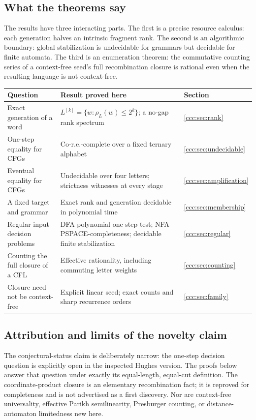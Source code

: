\documentclass[11pt,letterpaper]{article}
\theoremstyle{definition}
\theoremstyle{remark}
\newcommand{\gen}[2]{#1^{[#2]}}
\newcommand{\rank}{\rho}
\begin{document}
\subsection{What the theorems say}

The results have three interacting parts. The first is a precise resource
calculus: each generation halves an intrinsic fragment rank. The second is
an algorithmic boundary: global stabilization is undecidable for grammars but
decidable for finite automata. The third is an enumeration theorem: the
commutative counting series of a context-free seed's full recombination
closure is rational even when the resulting language is not context-free.

\begin{center}\small
\begin{tabular}{@{}p{}p{}p{}@{}}
\toprule
\textbf{Question} & \textbf{Result proved here} & \textbf{Section}\\
\midrule
Exact generation of a word &
$\gen Lk=\{w:\rank_L(w)\leq2^k\}$; a no-gap rank spectrum &
\ref{ccc:sec:rank}\\[3pt]
One-step equality for CFGs &
Co-r.e.-complete over a fixed ternary alphabet &
\ref{ccc:sec:undecidable}\\[3pt]
Eventual equality for CFGs &
Undecidable over four letters; strictness witnesses at every stage &
\ref{ccc:sec:amplification}\\[3pt]
A fixed target and grammar &
Exact rank and generation decidable in polynomial time &
\ref{ccc:sec:membership}\\[3pt]
Regular-input decision problems &
DFA polynomial one-step test; NFA PSPACE-completeness; decidable finite stabilization &
\ref{ccc:sec:regular}\\[3pt]
Counting the full closure of a CFL &
Effective rationality, including commuting letter weights &
\ref{ccc:sec:counting}\\[3pt]
Closure need not be context-free &
Explicit linear seed; exact counts and sharp recurrence orders &
\ref{ccc:sec:family}\\
\bottomrule
\end{tabular}
\end{center}

\subsection{Attribution and limits of the novelty claim}

The conjectural-status claim is deliberately narrow: the one-step decision
question is explicitly open in the inspected Hughes version. The proofs below
answer that question under exactly its equal-length, equal-cut definition.
The coordinate-product closure is an elementary recombination fact; it is
reproved for completeness and is not advertised as a first discovery. Nor are
context-free universality, effective Parikh semilinearity, Presburger counting,
or distance-automaton limitedness new here.
\end{document}
